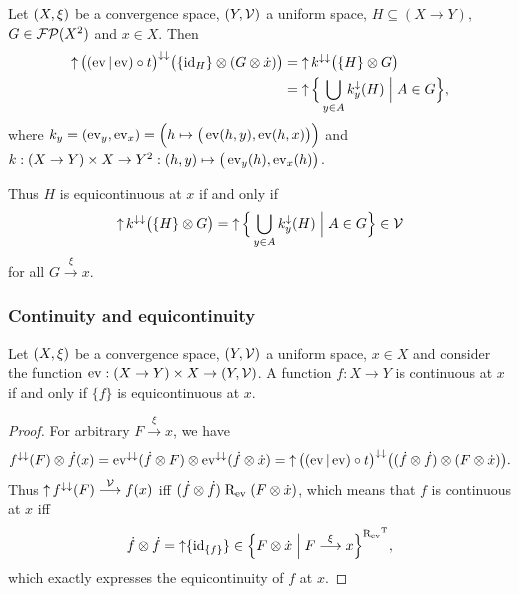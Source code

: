 \begin{lemma} \label{equicontinuityUnionLemma}
Let $\sSet{X,\xi}$ be a convergence space, $\sSet{Y, \mathcal{V}}$ a uniform space, $H \subseteq (X\to Y)$, $G\in \operatorname{\mathcal{FP}}(X^2)$ and $x\in X$. Then
\begin{align*}
\upset\big((\evalMap|\evalMap)\circ t\big)^{\imf\imf}\big(\{\id_{H}\}\otimes(G\otimes \pfilter{x})\big) &= \upset k^{\imf\imf}\big(\{H\}\otimes G\big) \\
&= \upset \setbuilder[\Big]{\bigcup_{y\in A}k_y^\imf(H)}{A\in G},
\end{align*}
where $k_y = (\operatorname{ev}_y, \operatorname{ev}_x) = \Big(h\mapsto \big(\operatorname{ev}(h,y), \operatorname{ev}(h,x)\big)\Big)$ and $k: (X\to Y)\times X\to Y^2: (h, y) \mapsto \big(\operatorname{ev}_y(h), \operatorname{ev}_x(h)\big)$.

Thus $H$ is equicontinuous at $x$ \textup{if and only if}
\[ \upset k^{\imf\imf}\big(\{H\}\otimes G\big) = \upset \setbuilder[\Big]{\bigcup_{y\in A}k_y^\imf(H)}{A\in G} \in \mathcal{V} \]
for all $G\overset{\xi}{\longrightarrow} x$.
\end{lemma}

\subsubsection{Continuity and equicontinuity}
\begin{lemma} \label{singletonEquicontinuity}
Let $\sSet{X,\xi}$ be a convergence space, $\sSet{Y, \mathcal{V}}$ a uniform space, $x\in X$ and consider the function $\evalMap: (X\to Y)\times X \to \sSet{Y,\mathcal{V}}$. A function $f: X\to Y$ is continuous at $x$ \textup{if and only if} $\{f\}$ is equicontinuous at $x$.
\end{lemma}
\begin{proof}
For arbitrary $F\overset{\xi}{\longrightarrow}x$, we have
\[ f^{\downarrow\downarrow}(F)\otimes \dot{f}(x) = \operatorname{ev}^{\downarrow\downarrow}(\dot{f}\otimes F) \otimes \operatorname{ev}^{\downarrow\downarrow}(\dot{f}\otimes \dot{x}) = \operatorname{\uparrow}\big((\operatorname{ev}|\operatorname{ev})\circ t\big)^{\downarrow\downarrow}\big((\dot{f}\otimes\dot{f})\otimes(F\otimes \dot{x})\big). \]
Thus $\operatorname{\uparrow} f^{\downarrow\downarrow}(F) \overset{\mathcal{V}}{\longrightarrow} f(x)$ iff $(\dot{f}\otimes \dot{f})\mathrel{\mathrm{R}_{\operatorname{ev}}}(F\otimes \dot{x})$, which means that $f$ is continuous at $x$ iff
\[ \pfilter{f}\otimes \pfilter{f} = \upset\{\id_{\{f\}}\} \in \setbuilder{F\otimes \pfilter{x}}{F\overset{\xi}{\longrightarrow}x}^{\uRelEv^\transp}, \]
which exactly expresses the equicontinuity of $f$ at $x$.
\end{proof}

